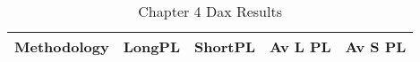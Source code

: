 \begin{table}[ht]
\centering
\caption[Chapter 4 Dax Results]{Chapter 4 Dax Results} 
\label{tab:chp6:dax_summary}
\begin{tabular}{lcccc}
  \toprule Methodology & LongPL & ShortPL & Av L PL & Av S PL \\ 
  \midrule  \bottomrule \end{tabular}
\end{table}
